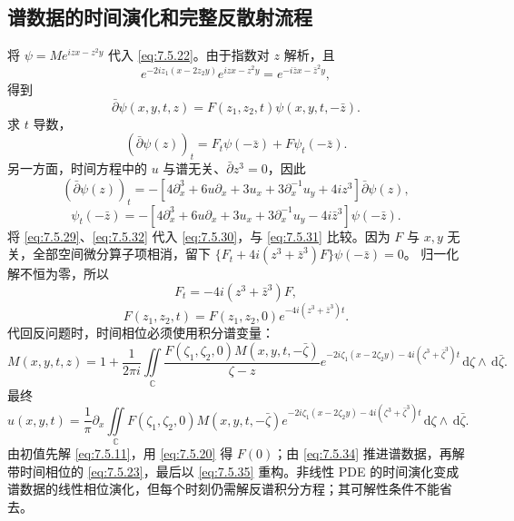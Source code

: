 \documentclass[lang=cn,scheme=chinese,mode=simple,device=normal,color=blue,math=cm,thmcnt=section,12pt]{elegantbook}
\newcommand{\dd}{\,\mathrm{d}}
\newcommand{\eqq}[2]{\tag{#1}\label{eq:#1}#2}
\begin{document}
\subsection{谱数据的时间演化和完整反散射流程}
将 $\psi=Me^{izx-z^2y}$ 代入 \eqref{eq:7.5.22}。由于指数对 $z$ 解析，且
\[
e^{-2iz_1(x-2z_2y)}e^{izx-z^2y}=e^{-i\bar zx-\bar z^2y},
\]
得到
\begin{equation}
\eqq{7.5.29}{\bar\partial\psi(x,y,t,z)=F(z_1,z_2,t)\psi(x,y,t,-\bar z).}
\end{equation}
求 $t$ 导数，
\begin{equation}
\eqq{7.5.30}{(\bar\partial\psi(z))_t=F_t\psi(-\bar z)+F\psi_t(-\bar z).}
\end{equation}
另一方面，时间方程中的 $u$ 与谱无关、$\bar\partial z^3=0$，因此
\begin{equation}
\eqq{7.5.31}{(\bar\partial\psi(z))_t=-[4\partial_x^3+6u\partial_x+3u_x+3\partial_x^{-1}u_y+4iz^3]\bar\partial\psi(z),}
\end{equation}
\begin{equation}
\eqq{7.5.32}{\psi_t(-\bar z)=-[4\partial_x^3+6u\partial_x+3u_x+3\partial_x^{-1}u_y-4i\bar z^3]\psi(-\bar z).}
\end{equation}
将 \eqref{eq:7.5.29}、\eqref{eq:7.5.32} 代入 \eqref{eq:7.5.30}，与 \eqref{eq:7.5.31} 比较。因为 $F$ 与 $x,y$ 无关，全部空间微分算子项相消，留下
$\{F_t+4i(z^3+\bar z^3)F\}\psi(-\bar z)=0$。
归一化解不恒为零，所以
\begin{equation}
\eqq{7.5.33}{F_t=-4i(z^3+\bar z^3)F,}
\end{equation}
\begin{equation}
\eqq{7.5.34}{F(z_1,z_2,t)=F(z_1,z_2,0)e^{-4i(z^3+\bar z^3)t}.}
\end{equation}
代回反问题时，时间相位必须使用积分谱变量：
\[
M(x,y,t,z)=1+\dfrac{1}{2\pi i}\iint\limits_{\mathbb C}
\dfrac{F(\zeta_1,\zeta_2,0)M(x,y,t,-\bar\zeta)}{\zeta-z}
e^{-2i\zeta_1(x-2\zeta_2y)-4i(\zeta^3+\bar\zeta^3)t}\dd\zeta\wedge\dd\bar\zeta.
\]
最终
\begin{equation}
\eqq{7.5.35}{u(x,y,t)=\dfrac{1}{\pi}\partial_x\iint\limits_{\mathbb C}
F(\zeta_1,\zeta_2,0)M(x,y,t,-\bar\zeta)
e^{-2i\zeta_1(x-2\zeta_2y)-4i(\zeta^3+\bar\zeta^3)t}\dd\zeta\wedge\dd\bar\zeta.}
\end{equation}
由初值先解 \eqref{eq:7.5.11}，用 \eqref{eq:7.5.20} 得 $F(0)$；由 \eqref{eq:7.5.34} 推进谱数据，再解带时间相位的 \eqref{eq:7.5.23}，最后以 \eqref{eq:7.5.35} 重构。非线性 PDE 的时间演化变成谱数据的线性相位演化，但每个时刻仍需解反谱积分方程；其可解性条件不能省去。
\end{document}
